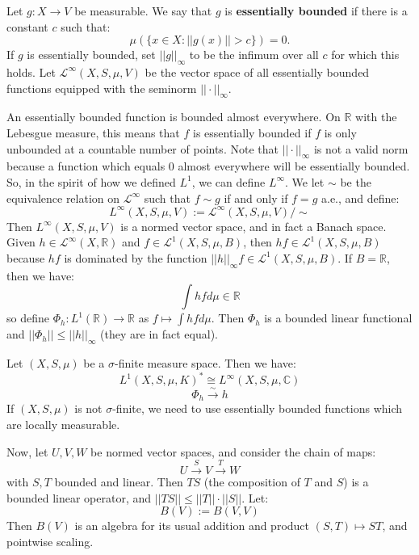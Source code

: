 	\begin{definition}
		Let $g : X\rightarrow V$ be measurable. We say that $g$ is \textbf{essentially bounded} if there is a constant $c$ 
		such that:
		$$
			\mu(\{x\in X : ||g(x)|| > c\}) = 0.
		$$
		If $g$ is essentially bounded, set $||g||_\infty$ to be the infimum over all $c$ for which this holds. Let $\mathcal L^\infty(X, 
		S, \mu, V)$ be the vector space of all essentially bounded functions equipped with the seminorm $||\cdot||_\infty$.
	\end{definition}
	
	An essentially bounded function is bounded almost everywhere. On $\mathbb R$ with the Lebesgue measure, this means that 
	$f$ is essentially bounded if $f$ is only unbounded at a countable number of points. Note that $||\cdot||_\infty$ is not a valid 
	norm because a function which equals 0 almost everywhere will be essentially bounded. So, in the spirit of how we 
	defined $L^1$, we can define $L^\infty$. We let $\sim$ be the equivalence relation on $\mathcal L^\infty$ such that 
	$f \sim g$ if and only if $f = g$ a.e., and define:
	$$
		L^\infty(X, S, \mu, V) := \mathcal L^\infty(X, S, \mu, V) / \sim
	$$
	Then $L^\infty(X, S, \mu, V)$ is a normed vector space, and in fact a Banach space. Given $h\in\mathcal L^\infty(X, 
	\mathbb R)$ and $f\in\mathcal L^1(X, S, \mu, B)$, then $hf\in\mathcal L^1(X, S, \mu, B)$ because $hf$ is dominated by the 
	function $||h||_\infty f\in\mathcal L^1(X, S, \mu, B)$. If $B = \mathbb R$, then we have:
	$$
		\int hfd\mu\in\mathbb R
	$$
	so define $\Phi_h : L^1(\mathbb R)\rightarrow\mathbb R$ as $f\mapsto\int hfd\mu$. Then $\Phi_h$ is a bounded linear 
	functional and $||\Phi_h||\leq ||h||_\infty$ (they are in fact equal). 
	
	\begin{theorem}
		Let $(X, S, \mu)$ be a $\sigma$-finite measure space. Then we have:
		$$
			L^1(X, S, \mu, K)^*\cong L^\infty(X, S, \mu, \mathbb C)
		$$
		$$
			\Phi_h\xrightarrow{\sim} h
		$$
		If $(X, S, \mu)$ is not $\sigma$-finite, we need to use essentially bounded functions which are locally measurable.
	\end{theorem}
	
	Now, let $U, V, W$ be normed vector spaces, and consider the chain of maps:
	$$
		U\xrightarrow{S} V\xrightarrow{T} W
	$$
	with $S, T$ bounded and linear. Then $TS$ (the composition of $T$ and $S$) is a bounded linear operator, and $||TS||
	\leq ||T||\cdot||S||$. Let:
	$$
		B(V) := B(V, V)
	$$
	Then $B(V)$ is an algebra for its usual addition and product $(S, T)\mapsto ST$, and pointwise scaling.
	
